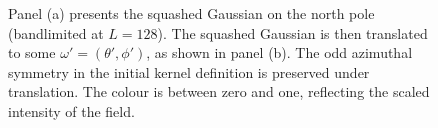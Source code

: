 \begin{figure}[htpb]
	\centering\capstart{}
	\hfill
	\caption[
		A squashed Gaussian on the north pole and then translated
	]{
		Panel (a) presents the squashed Gaussian on the north pole (bandlimited at \(L=128\)).
		The squashed Gaussian is then translated to some \(\omega'=(\theta',\phi')\), as shown in panel (b).
		The odd azimuthal symmetry in the initial kernel definition is preserved under translation.
		The colour is between zero and one, reflecting the scaled intensity of the field.
	}\label{fig:chapter3_squashed_gaussian}
\end{figure}
